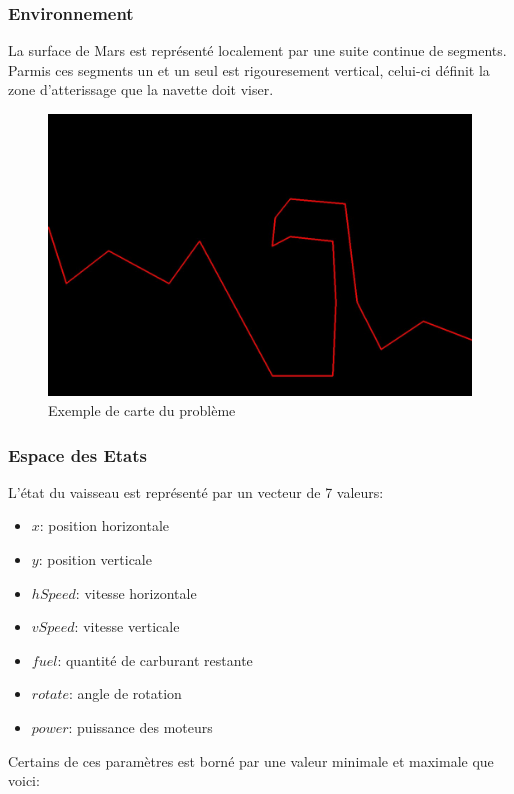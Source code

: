 \documentclass[french,a4paper,10pt,twocolumn]{article}
\begin{document}
\subsubsection{Environnement}

La surface de Mars est représenté localement par une suite continue de segments.
Parmis ces segments un et un seul est rigouresement vertical, celui-ci définit la zone d'atterissage que la navette doit viser.
\begin{figure}[h]
    \centering
    \includegraphics[scale=0.2]{images/cave_map.jpeg}
    \caption{Exemple de carte du problème}\label{fig:map}
\end{figure}

\subsubsection{Espace des Etats}

L'état du vaisseau est représenté par un vecteur de 7 valeurs:
\begin{itemize}
    \item $x$: position horizontale
    \item $y$: position verticale
    \item $hSpeed$: vitesse horizontale
    \item $vSpeed$: vitesse verticale
    \item $fuel$: quantité de carburant restante
    \item $rotate$: angle de rotation
    \item $power$: puissance des moteurs
\end{itemize}
Certains de ces paramètres est borné par une valeur minimale et maximale que voici: 
\end{document}
